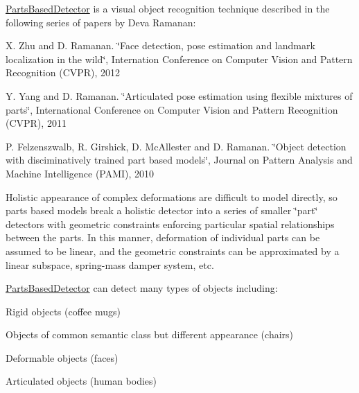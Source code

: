 \hyperlink{classPartsBasedDetector}{\-Parts\-Based\-Detector} is a visual object recognition technique described in the following series of papers by \-Deva \-Ramanan\-:


\begin{DoxyItemize}
\item \-X. \-Zhu and \-D. \-Ramanan. \char`\"{}\-Face detection, pose estimation and landmark localization
 in the wild\char`\"{}, \-Internation \-Conference on \-Computer \-Vision and \-Pattern \-Recognition (\-C\-V\-P\-R), 2012
\end{DoxyItemize}


\begin{DoxyItemize}
\item \-Y. \-Yang and \-D. \-Ramanan. \char`\"{}\-Articulated pose estimation using flexible mixtures of parts\char`\"{}, \-International \-Conference on \-Computer \-Vision and \-Pattern \-Recognition (\-C\-V\-P\-R), 2011
\end{DoxyItemize}


\begin{DoxyItemize}
\item \-P. \-Felzenszwalb, \-R. \-Girshick, \-D. \-Mc\-Allester and \-D. \-Ramanan. \char`\"{}\-Object detection with
 disciminatively trained part based models\char`\"{}, \-Journal on \-Pattern \-Analysis and \-Machine \-Intelligence (\-P\-A\-M\-I), 2010
\end{DoxyItemize}

\-Holistic appearance of complex deformations are difficult to model directly, so parts based models break a holistic detector into a series of smaller \char`\"{}part\char`\"{} detectors with geometric constraints enforcing particular spatial relationships between the parts. \-In this manner, deformation of individual parts can be assumed to be linear, and the geometric constraints can be approximated by a linear subspace, spring-\/mass damper system, etc.

\hyperlink{classPartsBasedDetector}{\-Parts\-Based\-Detector} can detect many types of objects including\-:
\begin{DoxyItemize}
\item \-Rigid objects (coffee mugs)
\item \-Objects of common semantic class but different appearance (chairs)
\item \-Deformable objects (faces)
\item \-Articulated objects (human bodies)
\end{DoxyItemize}

